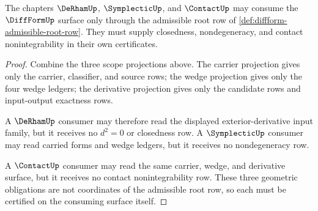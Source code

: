 \begin{theorem}
\label{thm:diffform-root-row-downstream-boundary}
The chapters $\DeRhamUp$, $\SymplecticUp$, and $\ContactUp$ may consume the
$\DiffFormUp$ surface only through the admissible root row of
\autoref{def:diffform-admissible-root-row}. They must supply closedness,
nondegeneracy, and contact nonintegrability in their own certificates.
\end{theorem}
\begin{proof}
Combine the three scope projections above. The carrier projection gives only
the carrier, classifier, and source rows; the wedge projection gives only the
four wedge ledgers; the derivative projection gives only the candidate rows
and input-output exactness rows.

A $\DeRhamUp$ consumer may therefore read the displayed exterior-derivative
input family, but it receives no $d^2=0$ or closedness row. A
$\SymplecticUp$ consumer may read carried forms and wedge ledgers, but it
receives no nondegeneracy row.

A $\ContactUp$ consumer may read the same carrier, wedge, and derivative
surface, but it receives no contact nonintegrability row. These three
geometric obligations are not coordinates of the admissible root row, so each
must be certified on the consuming surface itself.
\end{proof}
